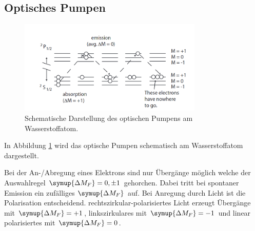 \subsection{Optisches Pumpen}
\begin{figure}
    \centering
    \includegraphics[width = 0.78\textwidth]{pics/pumpen.png}
    \caption{Schematische Darstellung des optischen Pumpens am Wasserstoffatom.\cite{Optisches pumpen}}
    \label{pic:pump}
\end{figure}
In Abbildung \ref{pic:pump} wird das optische Pumpen schematisch am Wasserstoffatom dargestellt.

Bei der An-/Abregung eines Elektrons sind nur Übergänge möglich welche der Auswahlregel $\symup{\Delta{M_F}} = 0, \pm 1$ gehorchen.
Dabei tritt bei spontaner Emission ein zufälliges $\symup{\Delta{M_F}}$ auf. Bei Anregung durch Licht ist die Polarisation entscheidend.
rechtszirkular-polarisiertes Licht erzeugt Übergänge mit $\symup{\Delta{M_F}} = +1$, linkszirkulares mit $\symup{\Delta{M_F}} = -1$ und linear polarisiertes
mit $\symup{\Delta{M_F}} = 0$.

